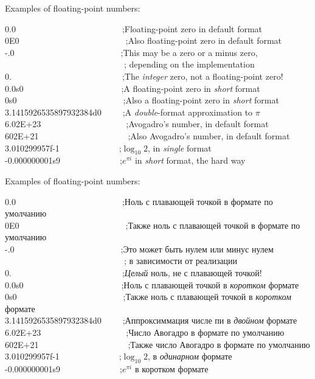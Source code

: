 Examples of floating-point numbers:
\begin{lisp}
0.0~~~~~~~~~~~~~~~~~~~~~~~~~;\textrm{Floating-point zero in default format} \\
0E0~~~~~~~~~~~~~~~~~~~~~~~~~;\textrm{Also floating-point zero in default format} \\
-.0~~~~~~~~~~~~~~~~~~~~~~~~~;\textrm{This may be a zero or a minus zero,} \\
~~~~~~~~~~~~~~~~~~~~~~~~~~~~; \textrm{depending on the implementation} \\
0.~~~~~~~~~~~~~~~~~~~~~~~~~~;\textrm{The \emph{integer} zero, not a floating-point zero!} \\
0.0s0~~~~~~~~~~~~~~~~~~~~~~~;\textrm{A floating-point zero in \emph{short} format} \\
0s0~~~~~~~~~~~~~~~~~~~~~~~~~;\textrm{Also a floating-point zero in \emph{short} format} \\
3.1415926535897932384d0~~~~~;\textrm{A \emph{double}-format approximation to $\pi$} \\
6.02E+23~~~~~~~~~~~~~~~~~~~~;\textrm{Avogadro's number, in default format} \\
602E+21~~~~~~~~~~~~~~~~~~~~~;\textrm{Also Avogadro's number, in default format} \\
3.010299957f-1~~~~~~~~~~~~~~;\textrm{$\log_{10} 2$, in \emph{single} format} \\
-0.000000001s9~~~~~~~~~~~~~~;\textrm{$e^{\pi i}$ in \emph{short} format, the hard way}
\end{lisp}

Examples of floating-point numbers:
\begin{lisp}
0.0~~~~~~~~~~~~~~~~~~~~~~~~~;\textrm{Ноль с плавающей точкой в формате по умолчанию} \\
0E0~~~~~~~~~~~~~~~~~~~~~~~~~;\textrm{Также ноль с плавающей точкой в формате по умолчанию} \\
-.0~~~~~~~~~~~~~~~~~~~~~~~~~;\textrm{Это может быть нулем или минус нулем} \\
~~~~~~~~~~~~~~~~~~~~~~~~~~~~; \textrm{в зависимости от реализации} \\
0.~~~~~~~~~~~~~~~~~~~~~~~~~~;\textrm{\emph{Целый} ноль, не с плавающей точкой!} \\
0.0s0~~~~~~~~~~~~~~~~~~~~~~~;\textrm{Ноль с плавающей точкой в \emph{коротком} формате} \\
0s0~~~~~~~~~~~~~~~~~~~~~~~~~;\textrm{Также ноль с плавающей точкой в \emph{коротком} формате} \\
3.1415926535897932384d0~~~~~;\textrm{Аппроксиммация числе пи в \emph{двойном} формате} \\
6.02E+23~~~~~~~~~~~~~~~~~~~~;\textrm{Число Авогадро в формате по умолчанию} \\
602E+21~~~~~~~~~~~~~~~~~~~~~;\textrm{Также число Авогадро в формате по умолчанию} \\
3.010299957f-1~~~~~~~~~~~~~~;\textrm{$\log_{10} 2$, в \emph{одинарном} формате} \\
-0.000000001s9~~~~~~~~~~~~~~;\textrm{$e^{\pi i}$ в коротком формате}
\end{lisp}

